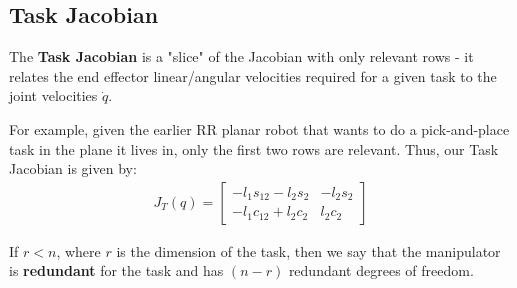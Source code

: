 \documentclass[../../master-handout.tex]{subfiles}
\begin{document}
\subsection{Task Jacobian}
The \textbf{Task Jacobian} is a "slice" of the Jacobian with only relevant rows - it relates the end effector linear/angular velocities required for a given task to the joint velocities $\dot{q}$.

For example, given the earlier RR planar robot that wants to do a pick-and-place task in the plane it lives in, only the first two rows are relevant. Thus, our Task Jacobian is given by:
\begin{align*}
    J_T(q) = \begin{bmatrix}
        -l_1s_{12} - l_2s_2 & -l_2s_2 \\ -l_1c_{12} + l_2c_2 & l_2c_2
    \end{bmatrix}
\end{align*}

If $r < n$, where $r$ is the dimension of the task, then we say that the manipulator is \textbf{redundant} for the task and has $(n-r)$ redundant degrees of freedom.
\end{document}
